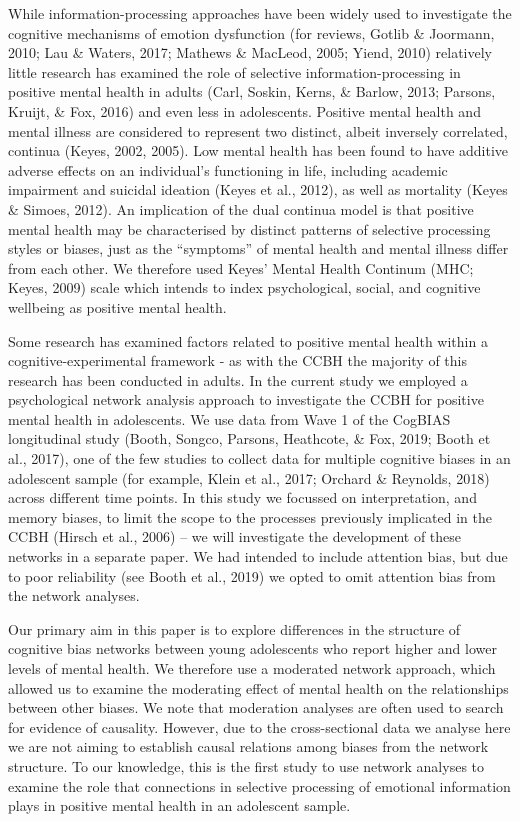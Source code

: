 \documentclass[
  english,
  man,floatsintext]{apa6}
\begin{document}
While information-processing approaches have been widely used to investigate the cognitive mechanisms of emotion dysfunction (for reviews, Gotlib \& Joormann, 2010; Lau \& Waters, 2017; Mathews \& MacLeod, 2005; Yiend, 2010) relatively little research has examined the role of selective information-processing in positive mental health in adults (Carl, Soskin, Kerns, \& Barlow, 2013; Parsons, Kruijt, \& Fox, 2016) and even less in adolescents. Positive mental health and mental illness are considered to represent two distinct, albeit inversely correlated, continua (Keyes, 2002, 2005). Low mental health has been found to have additive adverse effects on an individual's functioning in life, including academic impairment and suicidal ideation (Keyes et al., 2012), as well as mortality (Keyes \& Simoes, 2012). An implication of the dual continua model is that positive mental health may be characterised by distinct patterns of selective processing styles or biases, just as the \enquote{symptoms} of mental health and mental illness differ from each other. We therefore used Keyes' Mental Health Continum (MHC; Keyes, 2009) scale which intends to index psychological, social, and cognitive wellbeing as positive mental health.

Some research has examined factors related to positive mental health within a cognitive-experimental framework - as with the CCBH the majority of this research has been conducted in adults. In the current study we employed a psychological network analysis approach to investigate the CCBH for positive mental health in adolescents. We use data from Wave 1 of the CogBIAS longitudinal study (Booth, Songco, Parsons, Heathcote, \& Fox, 2019; Booth et al., 2017), one of the few studies to collect data for multiple cognitive biases in an adolescent sample (for example, Klein et al., 2017; Orchard \& Reynolds, 2018) across different time points. In this study we focussed on interpretation, and memory biases, to limit the scope to the processes previously implicated in the CCBH (Hirsch et al., 2006) -- we will investigate the development of these networks in a separate paper. We had intended to include attention bias, but due to poor reliability (see Booth et al., 2019) we opted to omit attention bias from the network analyses.

Our primary aim in this paper is to explore differences in the structure of cognitive bias networks between young adolescents who report higher and lower levels of mental health. We therefore use a moderated network approach, which allowed us to examine the moderating effect of mental health on the relationships between other biases. We note that moderation analyses are often used to search for evidence of causality. However, due to the cross-sectional data we analyse here we are not aiming to establish causal relations among biases from the network structure. To our knowledge, this is the first study to use network analyses to examine the role that connections in selective processing of emotional information plays in positive mental health in an adolescent sample.
\end{document}
